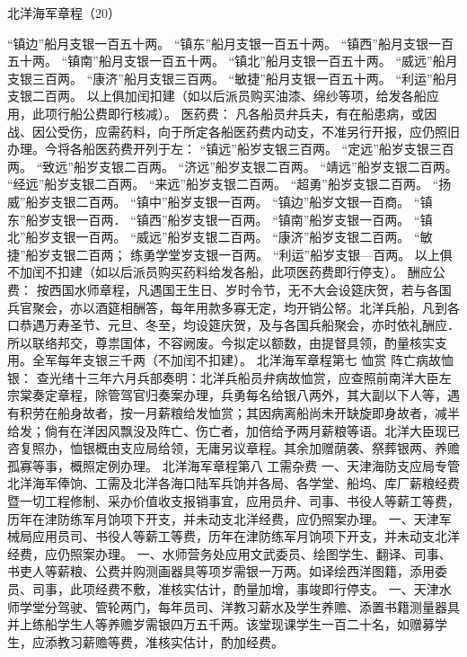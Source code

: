 \documentclass[12pt,UTF8]{ctexbook}
\begin{document}
北洋海军章程（20）

“镇边”船月支银一百五十两。
“镇东”船月支银一百五十两。
“镇西”船月支银一百五十两。
“镇南”船月支银一百五十两。
“镇北”船月支银一百五十两。
“威远”船月支银三百两。
“康济”船月支银三百两。
“敏捷”船月支银一百五十两。
“利运”船月支银二百两。
以上俱加闰扣建（如以后派员购买油漆、绵纱等项，给发各船应用，此项行船公费即行核减）。
医药费：
凡各船员弁兵夫，有在船患病，或因战、因公受伤，应需药料，向于所定各船医药费内动支，不准另行开报，应仍照旧办理。今将各船医药费开列于左：
“镇远”船岁支银三百两。
“定远”船岁支银三百两。
“致远”船岁支银二百两。
“济远”船岁支银二百两。
“靖远”船岁支银二百两。
“经远”船岁支银二百两。
“来远”船岁支银二百两。
“超勇”船岁支银二百两。
“扬威”船岁支银二百两。
“镇中”船岁支银一百两。
“镇边”船岁文银一百商。
“镇东”船岁支银一百两．
“镇西”船岁支银一百两。
“镇南”船岁支银一百两。
“镇北”船岁支银一百两。
“威远”船岁支银二百两。
“康济”船岁支银二百两。
“敏捷”船岁支银二百两；
练勇学堂岁支银一百两。
“利运”船岁支银—百两。
以上俱不加闰不扣建（如以后派员购买药料给发各船，此项医药费即行停支）。
酬应公费：
按西国水师章程，凡遇国王生日、岁时令节，无不大会设筵庆贺，若与各国兵官聚会，亦以酒筵相酬答，每年用款多寡无定，均开销公帑。北洋兵船，凡到各口恭遇万寿圣节、元旦、冬至，均设筵庆贺，及与各国兵船聚会，亦时依礼酬应．所以联络邦交，尊祟国体，不容阙废。今拟定以额数，由提督具领，酌量核实支用。全军每年支银三千两（不加闰不扣建）。
北洋海军章程第七
恤赏
阵亡病故恤银：
查光绪十三年六月兵部奏明：北洋兵船员弁病故恤赏，应查照前南洋大臣左宗棠奏定章程，除管驾官归奏案办理，兵勇每名给银八两外，其大副以下人等，遇有积劳在船身故者，按一月薪粮给发恤赏；其因病离船尚未开缺旋即身故者，减半给发；倘有在洋因风飘没及阵亡、伤亡者，加倍给予两月薪粮等语。北洋大臣现已咨复照办，恤银概由支应局给领，无庸另议章程。其余加赠荫袭、祭葬银两、养赡孤寡等事，概照定例办理。
北洋海军章程第八
工需杂费
一、天津海防支应局专管北洋海军俸饷、工需及北洋各海口陆军兵饷并各局、各学堂、船坞、库厂薪粮经费暨一切工程修制、采办价值收支报销事宜，应用员弁、司事、书役人等薪工等费，历年在津防练军月饷项下开支，并未动支北洋经费，应仍照案办理。
一、天津军械局应用员司、书役人等薪工等费，历年在津防练军月饷项下开支，并未动支北洋经费，应仍照案办理。
一、水师营务处应用文武委员、绘图学生、翻译、司事、书吏人等薪粮、公费并购测画器具等项岁需银一万两。如译绘西洋图籍，添用委员、司事，此项经费不敷，准核实估计，酌量加增，事竣即行停支。
一、天津水师学堂分驾驶、管轮两门，每年员司、洋教习薪水及学生养赡、添置书籍测量器具并上练船学生人等养赡岁需银四万五千两。该堂现课学生一百二十名，如赠募学生，应添教习薪赡等费，准核实估计，酌加经费。
\end{document}
